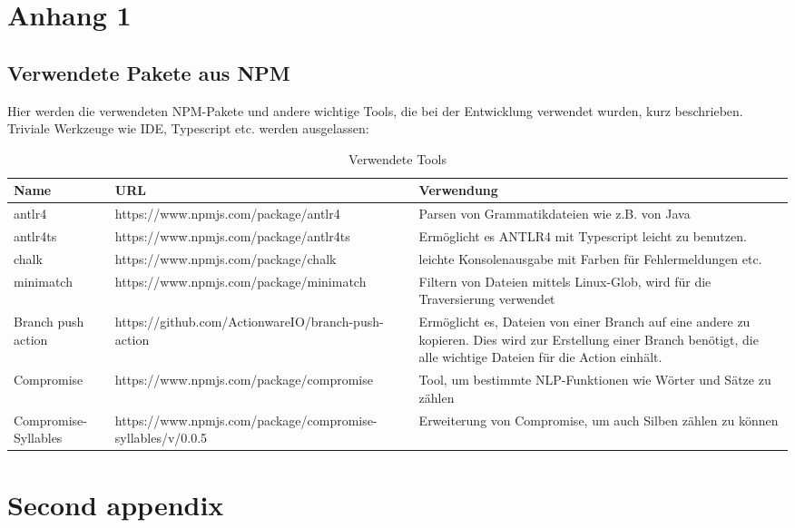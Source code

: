 
\begin{appendices}


\chapter{Anhang 1}
\section{Verwendete Pakete aus NPM}
Hier werden die verwendeten NPM-Pakete und andere wichtige Tools, die bei der Entwicklung verwendet wurden, kurz beschrieben. Triviale Werkzeuge wie IDE, Typescript etc. werden ausgelassen:
\begin{table}[h]
    \begin{tabular}{m{2.3cm}|m{8.5cm}|m{6.0cm}}
       Name  & URL & Verwendung  \\
       \hline
        antlr4 & https://www.npmjs.com/package/antlr4 & Parsen von Grammatikdateien wie z.B. von Java\\
        \hline
        antlr4ts & https://www.npmjs.com/package/antlr4ts & Ermöglicht es ANTLR4 mit Typescript leicht zu benutzen. \\\hline
        chalk & https://www.npmjs.com/package/chalk & leichte Konsolenausgabe mit Farben für Fehlermeldungen etc. \\\hline
        minimatch & https://www.npmjs.com/package/minimatch & Filtern von Dateien mittels  Linux-Glob, wird für die Traversierung verwendet\\\hline
        Branch push action & https://github.com/ActionwareIO/branch-push-action & Ermöglicht es, Dateien von einer Branch auf eine andere zu kopieren. Dies wird zur Erstellung einer Branch benötigt, die alle wichtige Dateien für die Action einhält.\\\hline
        Compromise & https://www.npmjs.com/package/compromise & Tool, um bestimmte NLP-Funktionen wie Wörter und Sätze zu zählen\\\hline
        Compromise-Syllables & https://www.npmjs.com/package/compromise-syllables/v/0.0.5 & Erweiterung von Compromise, um auch Silben zählen zu können
    \end{tabular}
    \caption{Verwendete Tools}
    \label{tab:used_tools}
\end{table}





\chapter{Second appendix}
\label{app:second}


\end{appendices}
	

